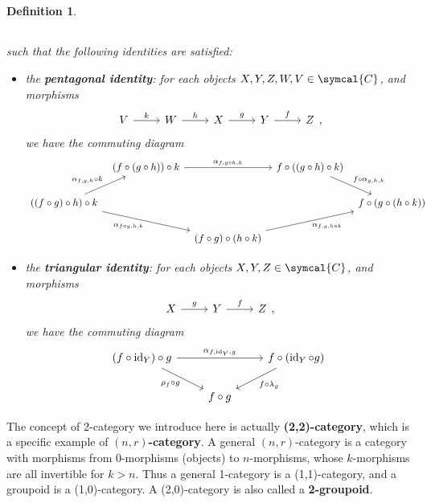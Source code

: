 \documentclass{article}
\theoremstyle{theorem}
\newtheorem{definition}{Definition}[section]
\theoremstyle{remark}
\def\calC{{\symcal{C}}}
\DeclareMathOperator{\id}{id}
\begin{document}
\begin{definition}
\begin{itemize}
$$\begin{tikzcd}
        \end{tikzcd}$$
    \end{itemize}
    such that the following identities are satisfied:
    \begin{itemize}
        \item the \textbf{pentagonal identity}: for each objects $X, Y, Z, W, V \in \calC$, and morphisms 
        $$\begin{tikzcd}
            V & W & X & Y & Z
            \arrow["k", from=1-1, to=1-2]
            \arrow["h", from=1-2, to=1-3]
            \arrow["g", from=1-3, to=1-4]
            \arrow["f", from=1-4, to=1-5]
        \end{tikzcd},$$ 
        we have the commuting diagram
        $$\begin{tikzcd}[column sep=tiny]
            & {(f \circ (g \circ h)) \circ k} && {f \circ ((g \circ h) \circ k)} \\
            {((f \circ g) \circ h) \circ k} &&&& {f \circ (g \circ (h \circ k))} \\
            && {(f \circ g) \circ (h \circ k)}
            \arrow["{\alpha_{f,g \circ h,k}}", from=1-2, to=1-4]
            \arrow["{f \circ \alpha_{g,h,k}}", from=1-4, to=2-5]
            \arrow["{\alpha_{f,g,h}\circ k}", from=2-1, to=1-2]
            \arrow["{\alpha_{f \circ g,h,k}}"', from=2-1, to=3-3]
            \arrow["{\alpha_{f,g,h \circ k}}"', from=3-3, to=2-5]
        \end{tikzcd}$$
        \item the \textbf{triangular identity}: for each objects $X, Y, Z \in \calC$, and morphisms
        $$\begin{tikzcd}
            X & Y & Z
            \arrow["g", from=1-1, to=1-2]
            \arrow["f", from=1-2, to=1-3]
        \end{tikzcd},$$
        we have the commuting diagram
        $$\begin{tikzcd}
            {(f \circ \id_Y) \circ g} && {f \circ (\id_Y \circ g)} \\
            & {f \circ g}
            \arrow["{\alpha_{f,\id_Y,g}}", from=1-1, to=1-3]
            \arrow["{\rho_f \circ g}"', from=1-1, to=2-2]
            \arrow["{f \circ \lambda_g}", from=1-3, to=2-2]
        \end{tikzcd}$$
    \end{itemize}
\end{definition}

The concept of 2-category we introduce here is actually \textbf{(2,2)-category}, which is a specific example of \textbf{$(n,r)$-category}. A general $(n,r)$-category is a category with morphisms from 0-morphisms (objects) to $n$-morphisms, whose $k$-morphisms are all invertible for $k > n$. Thus a general 1-category is a (1,1)-category, and a groupoid is a (1,0)-category. A (2,0)-category is also called a \textbf{2-groupoid}.
\end{document}
